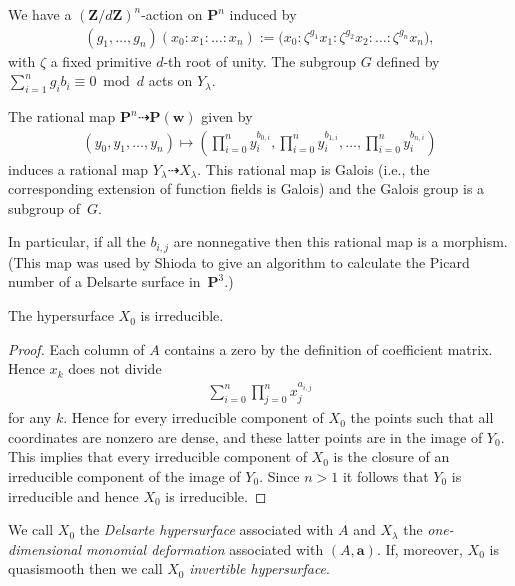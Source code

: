 We have a $(\mathbf{Z}/d\mathbf{Z})^{n}$-action on $\mathbf{P}^n$ induced by
\begin{gather*} (g_1,\dots,g_n)(x_0:x_1:\dots:x_n):=\big(x_0:\zeta^{g_1}x_1:\zeta^{g_2}x_2:\dots:\zeta^{g_n}x_n\big),\end{gather*}
with $\zeta$ a f\/ixed primitive $d$-th root of unity. The subgroup $G$ def\/ined by $\sum\limits_{i=1}^n g_i b_i\equiv 0 \bmod d$ acts on $Y_{\lambda}$.

The rational map $\mathbf{P}^n\dashrightarrow \mathbf{P}(\mathbf{w})$ given by
\begin{gather*} (y_0,y_1,\dots,y_n) \mapsto \left(\prod_{i=0}^n y_i^{b_{0,i}},\prod_{i=0}^n y_i^{b_{1,i}},\dots,\prod_{i=0}^n y_i^{b_{n,i}}\right)\end{gather*}
induces a rational map $Y_{\lambda}\dashrightarrow X_{\lambda}$. This rational map is Galois (i.e., the corresponding extension of function f\/ields is Galois) and the Galois group is a subgroup of~$G$.

In particular, if all the $b_{i,j}$ are nonnegative then this rational map is a morphism. (This map was used by Shioda \cite{ShiExpPic} to give an algorithm to calculate the Picard number of a Delsarte surface in~$\mathbf{P}^3$.)

\begin{Lemma}
The hypersurface $X_0$ is irreducible.
\end{Lemma}
\begin{proof}
 Each column of $A$ contains a zero by the def\/inition of coef\/f\/icient matrix. Hence $x_k$ does not divide \begin{gather*}\sum_{i=0}^n \prod_{j=0}^n x_j^{a_{i,j}}\end{gather*}
for any $k$. Hence for every irreducible component of $X_0$ the points such that all coordinates are nonzero are dense, and these latter points are in the image of $Y_0$. This implies that every irreducible component of $X_0$ is the closure of an irreducible component of the image of $Y_0$. Since $n>1$ it follows that $Y_0$ is irreducible and hence $X_0$ is irreducible.
\end{proof}

\begin{Definition}
We call $X_0$ the \emph{Delsarte hypersurface} associated with $A$ and $X_\lambda$ the \emph{one-dimen\-sio\-nal monomial deformation} associated with $(A,\mathbf{a})$. If, moreover, $X_0$ is quasismooth then we call $X_0$ \emph{invertible hypersurface}.
\end{Definition}

